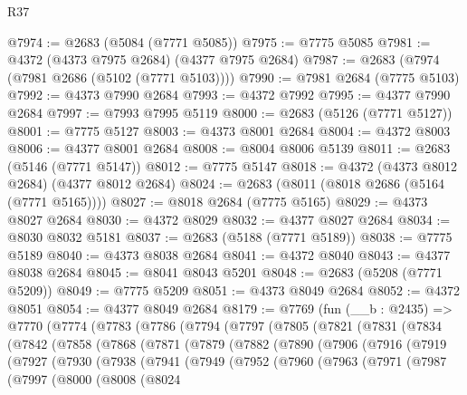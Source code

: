 \begin{lexlean}{R37}
\begin{coremodule}
@7974 := @2683 (@5084 (@7771 @5085))
@7975 := @7775 @5085
@7981 := @4372 (@4373 @7975 @2684) (@4377 @7975 @2684)
@7987 := @2683 (@7974 (@7981 @2686 (@5102 (@7771 @5103))))
@7990 := @7981 @2684 (@7775 @5103)
@7992 := @4373 @7990 @2684
@7993 := @4372 @7992
@7995 := @4377 @7990 @2684
@7997 := @7993 @7995 @5119
@8000 := @2683 (@5126 (@7771 @5127))
@8001 := @7775 @5127
@8003 := @4373 @8001 @2684
@8004 := @4372 @8003
@8006 := @4377 @8001 @2684
@8008 := @8004 @8006 @5139
@8011 := @2683 (@5146 (@7771 @5147))
@8012 := @7775 @5147
@8018 := @4372 (@4373 @8012 @2684) (@4377 @8012 @2684)
@8024 := @2683 (@8011 (@8018 @2686 (@5164 (@7771 @5165))))
@8027 := @8018 @2684 (@7775 @5165)
@8029 := @4373 @8027 @2684
@8030 := @4372 @8029
@8032 := @4377 @8027 @2684
@8034 := @8030 @8032 @5181
@8037 := @2683 (@5188 (@7771 @5189))
@8038 := @7775 @5189
@8040 := @4373 @8038 @2684
@8041 := @4372 @8040
@8043 := @4377 @8038 @2684
@8045 := @8041 @8043 @5201
@8048 := @2683 (@5208 (@7771 @5209))
@8049 := @7775 @5209
@8051 := @4373 @8049 @2684
@8052 := @4372 @8051
@8054 := @4377 @8049 @2684
@8179 := @7769
    (fun (__b : @2435) =>
    @7770
      (@7774
        (@7783
          (@7786
            (@7794
              (@7797
                (@7805
                  (@7821
                    (@7831
                      (@7834
                        (@7842
                          (@7858
                            (@7868
                              (@7871
                                (@7879
                                  (@7882
                                    (@7890
                                      (@7906
                                        (@7916
                                          (@7919
                                            (@7927
                                              (@7930
                                                (@7938
                                                  (@7941
                                                    (@7949
                                                      (@7952
                                                        (@7960
                                                          (@7963
                                                            (@7971
                                                              (@7987
                                                                (@7997
                                                                  (@8000
                                                                    (@8008
                                                                      (@8024

\end{coremodule}
\end{lexlean}
